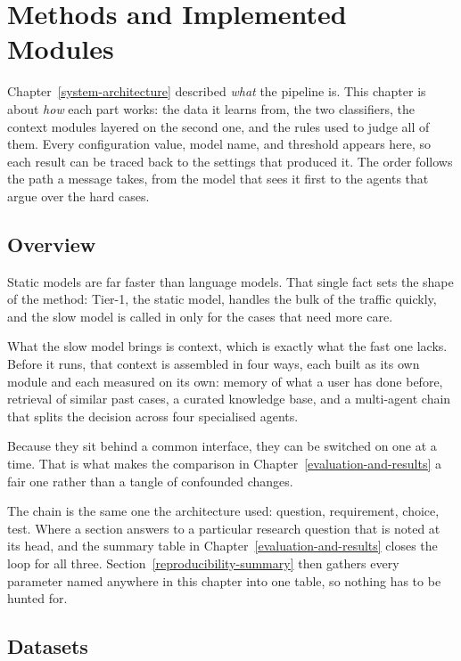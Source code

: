 \chapter{Methods and Implemented Modules}\label{methods-and-implemented-modules}

Chapter~\ref{system-architecture} described \emph{what} the pipeline is. This chapter is about \emph{how} each part works: the data it learns from, the two classifiers, the context modules layered on the second one, and the rules used to judge all of them. Every configuration value, model name, and threshold appears here, so each result can be traced back to the settings that produced it. The order follows the path a message takes, from the model that sees it first to the agents that argue over the hard cases.

\section{Overview}\label{overview}

Static models are far faster than language models. That single fact sets the shape of the method: Tier-1, the static model, handles the bulk of the traffic quickly, and the slow model is called in only for the cases that need more care.

What the slow model brings is context, which is exactly what the fast one lacks. Before it runs, that context is assembled in four ways, each built as its own module and each measured on its own: memory of what a user has done before, retrieval of similar past cases, a curated knowledge base, and a multi-agent chain that splits the decision across four specialised agents.

Because they sit behind a common interface, they can be switched on one at a time. That is what makes the comparison in Chapter~\ref{evaluation-and-results} a fair one rather than a tangle of confounded changes.

The chain is the same one the architecture used: question, requirement, choice, test. Where a section answers to a particular research question that is noted at its head, and the summary table in Chapter~\ref{evaluation-and-results} closes the loop for all three. Section~\ref{reproducibility-summary} then gathers every parameter named anywhere in this chapter into one table, so nothing has to be hunted for.

\section{Datasets}\label{datasets}

